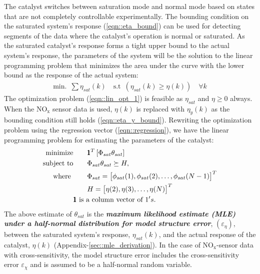 \documentclass[subscriptcorrection,upint,varvw,barcolor=Goldenrod3,mathalfa=cal=euler,balance,hyphenate,french,pdf-a]{asmejour}
\renewcommand{\bm}[1]{\begin{bmatrix} #1 \end{bmatrix}}
\newcommand{\itbf}[1]{\noindent\textit{\textbf{#1}}}
\newcommand{\lr}[1]{\left( #1 \right)}
\newcommand{\lrb}[1]{\left[ #1 \right]}
\newcommand{\nox}{\text{NO}_{\text{x}}}
\begin{document}
The catalyst switches between saturation mode and normal mode based on states that are not completely controllable
experimentally. The bounding condition on the saturated system's response (\ref{eqn::eta_bound}) can be used for
detecting segments of the data where the catalyst's operation is normal or saturated. As the saturated catalyst's
response forms a tight upper bound to the actual system's response, the parameters of the system will be the solution
to the linear programming problem that minimizes the area under the curve with the lower bound as the response of the
actual system:
\begin{align}
\text{min. } \, \sum \eta_{sat}(k) \quad
\text{s.t } \, \lr{\eta_{sat}(k) \geq \eta(k)} \quad \forall  k \label{eqn::lin_opt_1}
\end{align}
The optimization problem (\ref{eqn::lin_opt_1}) is feasible as $\eta_{sat}$ and $\eta \geq 0$ always. When the $\nox$ sensor
data is used, $\eta(k)$ is replaced with $\eta_y(k)$ as the bounding condition still holds (\ref{eqn::eta_y_bound}).
Rewriting the optimization problem using the regression vector (\ref{eqn::regression}), we have the linear programming
problem for estimating the parameters of the catalyst:
\begin{align}
        \text{minimize} &\qquad \pmb 1^T \lrb{\Phi_{sat} \theta_{sat}}      \label{eqn::lin_prog}\\
        \text{subject to} &\qquad \Phi_{sat} \theta_{sat} \succeq H,  \notag\\
        \text{where } & \qquad
        \Phi_{sat} = \bm{\phi_{sat}(1), \phi_{sat}(2), \hdots, \phi_{sat}(N-1)}^T \notag\\
        &\qquad H = \bm{ \eta(2), \eta(3), \hdots, \eta(N)}^T \notag\\
        & \text{$\pmb 1$ is a column vector of $1's$.} \notag
\end{align}
The above estimate of $\theta_{sat}$ is the \itbf{maximum likelihood estimate (MLE) under a half-normal distribution
\cite{942636} for model structure error}, $\lr{\varepsilon_\eta}$, between the saturated system's response,
$\eta_{sat}(k)$, and the actual response of the catalyst, $\eta(k)$ (Appendix-\ref{sec::mle_derivation}). In the
case of $\nox$-sensor data with cross-sensitivity, the model structure error includes the cross-sensitivity error
$\varepsilon_{\chi}$ and is assumed to be a half-normal random variable.
\end{document}
